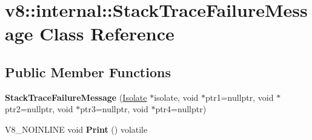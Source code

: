 \hypertarget{classv8_1_1internal_1_1StackTraceFailureMessage}{}\section{v8\+:\+:internal\+:\+:Stack\+Trace\+Failure\+Message Class Reference}
\label{classv8_1_1internal_1_1StackTraceFailureMessage}
\subsection*{Public Member Functions}
\begin{DoxyCompactItemize}
\item 
\mbox{\label{classv8_1_1internal_1_1StackTraceFailureMessage_a74c28f1caa8a24b15ec4c3f189ac1eac}} 
{\bfseries Stack\+Trace\+Failure\+Message} (\mbox{\hyperlink{classv8_1_1internal_1_1Isolate}{Isolate}} $\ast$isolate, void $\ast$ptr1=nullptr, void $\ast$ptr2=nullptr, void $\ast$ptr3=nullptr, void $\ast$ptr4=nullptr)
\item 
\mbox{\label{classv8_1_1internal_1_1StackTraceFailureMessage_a861f38cb7e2b28407762976028d082eb}} 
V8\+\_\+\+N\+O\+I\+N\+L\+I\+NE void {\bfseries Print} () volatile
\end{DoxyCompactItemize}
